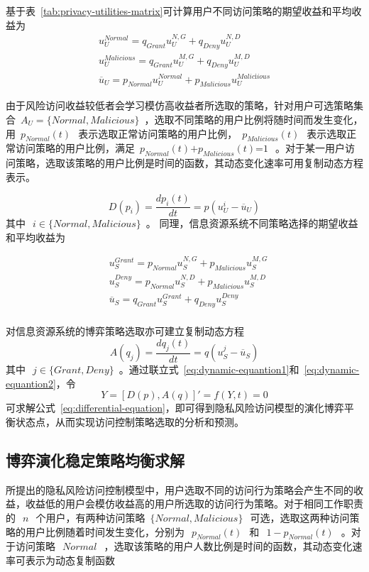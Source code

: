 基于表~\ref{tab:privacy-utilities-matrix}可计算用户不同访问策略的期望收益和平均收益为
\begin{eqnarray}\label{eq:utilities-users}
u_{U}^{Normal}={{q}_{Grant}}u_{U}^{N,G}+{{q}_{Deny}}u_{U}^{N,D} \\ 
 u_{U}^{Malicious}={{q}_{Grant}}u_{U}^{M,G}+{{q}_{Deny}}u_{U}^{M,D} \\ 
{{\overline{u}}_{U}}={{p}_{Normal}}u_{U}^{Normal}+{{p}_{Malicious}}u_{U}^{Malic\text{i}ious}
\end{eqnarray}


由于风险访问收益较低者会学习模仿高收益者所选取的策略，针对用户可选策略集合~${{A}_{U}}=\{Normal,Malicious\}$~，选取不同策略的用户比例将随时间而发生变化，用~${{p}_{Normal}}(t)~$~表示选取正常访问策略的用户比例，~${{p}_{Malicious}}(t)~$~表示选取正常访问策略的用户比例，满足~${{p}_{Normal}}(t)\text{+}{{p}_{Malicious}}(t)\text{=}1~$~。对于某一用户访问策略，选取该策略的用户比例是时间的函数，其动态变化速率可用复制动态方程表示。

\begin{equation}\label{eq:dynamic-equantion1}
D({{p}_{i}})=\frac{d{{p}_{i}}(t)}{dt}=p(u_{U}^{i}-{{\overline{u}}_{U}})
\end{equation}
其中~$~i\in \{Normal,Malicious\}$~。
同理，信息资源系统不同策略选择的期望收益和平均收益为

\begin{align}
& u_{S}^{Grant}={{p}_{Normal}}u_{S}^{N,G}+{{p}_{Malicious}}u_{S}^{M,G} \\ 
& u_{S}^{Deny}={{p}_{Normal}}u_{S}^{N,D}+{{p}_{Malicious}}u_{S}^{M,D} \\ 
& {{\overline{u}}_{S}}={{q}_{Grant}}u_{S}^{Grant}+{{q}_{Deny}}u_{S}^{Deny} \\ 
\end{align}

对信息资源系统的博弈策略选取亦可建立复制动态方程
\begin{equation}\label{eq:dynamic-equantion2}
A({{q}_{j}})=\frac{d{{q}_{j}}(t)}{dt}=q(u_{S}^{j}-{{\overline{u}}_{S}})
\end{equation}
其中~$~j\in \{Grant,Deny\}$~。通过联立式~\ref{eq:dynamic-equantion1}和~\ref{eq:dynamic-equantion2}，令
\begin{equation}\label{eq:differential-equation}
Y=[ D(p), A(q)]'=f(Y,t)=0
\end{equation}
可求解公式~\ref{eq:differential-equation}，即可得到隐私风险访问模型的演化博弈平衡状态点，从而实现访问控制策略选取的分析和预测。

\subsection{博弈演化稳定策略均衡求解}
\label{subsec:solution}
所提出的隐私风险访问控制模型中，用户选取不同的访问行为策略会产生不同的收益，收益低的用户会模仿收益高的用户所选取的访问行为策略。对于相同工作职责的~$~n~$~个用户，有两种访问策略~$\{Normal, Malicious\} ~$~可选，选取这两种访问策略的用户比例随着时间发生变化，分别为~$~p_{Normal}(t)~$~和~$~1-p_{Normal}(t)~$~。对于访问策略~$~Normal~$~，选取该策略的用户人数比例是时间的函数，其动态变化速率可表示为动态复制函数

